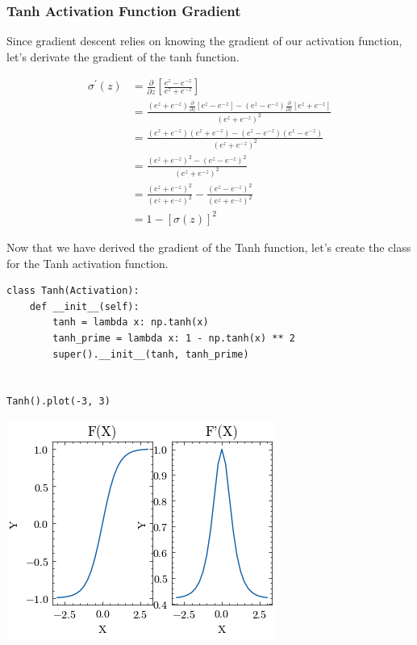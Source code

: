 \documentclass[openany]{book}
\begin{document}
    \subsubsection{Tanh Activation Function
Gradient}\label{tanh-activation-function-gradient}

Since gradient descent relies on knowing the gradient of our activation
function, let's derivate the gradient of the tanh function.

\begin{align*}
\sigma^\prime(z) &= \frac{\partial}{\partial z} [ \frac{e^z-e^{-z}}{e^z+e^{-z}} ] \\
&= \frac{(e^z+e^{-z})\frac{\partial}{\partial z}[e^z-e^{-z}] - (e^z-e^{-z})\frac{\partial}{\partial z}[e^z+e^{-z}]}{({e^z+e^{-z}})^2} \\
&= \frac{(e^z+e^{-z})(e^z+e^{-z}) - (e^z-e^{-z})(e^z-e^{-z})}{({e^z+e^{-z}})^2} \\
&= \frac{(e^z+e^{-z})^2 - (e^z-e^{-z})^2}{({e^z+e^{-z}})^2} \\
&= \frac{(e^z+e^{-z})^2}{({e^z+e^{-z}})^2} - \frac{(e^z-e^{-z})^2}{({e^z+e^{-z}})^2} \\
&= 1 - [\sigma(z)]^2
\end{align*}

    Now that we have derived the gradient of the Tanh function, let's create
the class for the Tanh activation function.

\begin{tcolorbox}
\tiny
\begin{verbatim}
class Tanh(Activation):
    def __init__(self):
        tanh = lambda x: np.tanh(x)
        tanh_prime = lambda x: 1 - np.tanh(x) ** 2
        super().__init__(tanh, tanh_prime)


Tanh().plot(-3, 3)
\end{verbatim}
\end{tcolorbox}

    \begin{center}
    \includegraphics[width=\textwidth]{combined_files/combined_177_0.png}
    \end{center}
    { \hspace*{\fill} \\}
    
\end{document}
